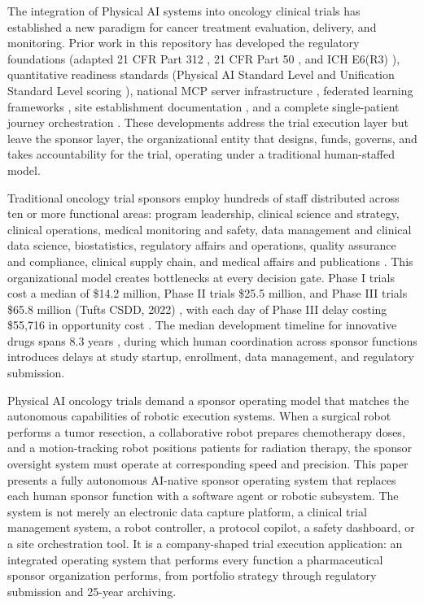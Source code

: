 
The integration of Physical AI systems into oncology clinical trials has established a new
paradigm for cancer treatment evaluation, delivery, and monitoring. Prior work in this
repository has developed the regulatory foundations (adapted 21 CFR Part 312 \cite{cfr312-adapt},
21 CFR Part 50 \cite{cfr50-adapt}, and ICH E6(R3) \cite{ich-adapt}), quantitative readiness
standards (Physical AI Standard Level and Unification Standard Level scoring
\cite{usl-standard}), national MCP server infrastructure \cite{national-mcp-paper}, federated
learning frameworks \cite{fl-paper}, site establishment documentation \cite{site-docs}, and a
complete single-patient journey orchestration \cite{patient-journey-paper}. These developments
address the trial execution layer but leave the sponsor layer, the organizational entity that
designs, funds, governs, and takes accountability for the trial, operating under a traditional
human-staffed model.

Traditional oncology trial sponsors employ hundreds of staff distributed across ten or more
functional areas: program leadership, clinical science and strategy, clinical operations,
medical monitoring and safety, data management and clinical data science, biostatistics,
regulatory affairs and operations, quality assurance and compliance, clinical supply chain,
and medical affairs and publications \cite{ich-e6r3}. This organizational model creates
bottlenecks at every decision gate. Phase I trials cost a median of \$14.2 million, Phase II
trials \$25.5 million, and Phase III trials \$65.8 million (Tufts CSDD, 2022)
\cite{tufts-csdd-cost}, with each day of Phase III delay costing \$55,716 in opportunity
cost \cite{tufts-delay}. The median development timeline for innovative drugs spans 8.3 years
\cite{tufts-timeline}, during which human coordination across sponsor functions introduces
delays at study startup, enrollment, data management, and regulatory submission.

Physical AI oncology trials demand a sponsor operating model that matches the autonomous
capabilities of robotic execution systems. When a surgical robot performs a tumor resection,
a collaborative robot prepares chemotherapy doses, and a motion-tracking robot positions
patients for radiation therapy, the sponsor oversight system must operate at corresponding
speed and precision. This paper presents a fully autonomous AI-native sponsor operating system
that replaces each human sponsor function with a software agent or robotic subsystem. The
system is not merely an electronic data capture platform, a clinical trial management system,
a robot controller, a protocol copilot, a safety dashboard, or a site orchestration tool. It
is a company-shaped trial execution application: an integrated operating system that performs
every function a pharmaceutical sponsor organization performs, from portfolio strategy through
regulatory submission and 25-year archiving.

